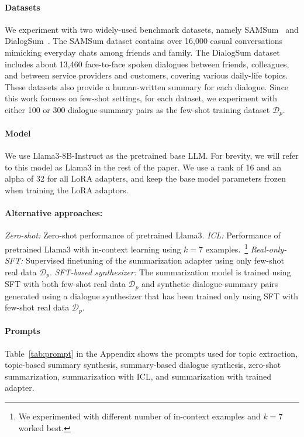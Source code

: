 \paragraph{Datasets} We experiment with two widely-used benchmark datasets, namely SAMSum~\citep{gliwa-etal-2019-samsum} and DialogSum~\citep{chen2021dialogsum}. The SAMSum dataset contains over 16,000 casual conversations mimicking everyday chats among friends and family. The DialogSum dataset includes about 13,460 face-to-face spoken dialogues between friends, colleagues, and between service providers and customers, covering various daily-life topics. These datasets also provide a human-written summary for each dialogue. Since this work focuses on few-shot settings, for each dataset, we experiment with either 100 or 300 dialogue-summary pairs as the few-shot training dataset $\mathcal{D}_p$.

\paragraph{Model} We use Llama3-8B-Instruct \citep{dubey2024llama} as the pretrained base LLM. For brevity, we will refer to this model as Llama3 in the rest of the paper. We use a rank of 16 and an alpha of 32 for all LoRA adapters, and keep the base model parameters frozen when training the LoRA adaptors. 

\paragraph{Alternative approaches:} \textit{Zero-shot:} Zero-shot performance of pretrained Llama3. \textit{ICL:} Performance of pretrained Llama3 with in-context learning using $k=7$ examples.~\footnote{We experimented with different number of in-context examples and $k=7$ worked best.} \textit{Real-only-SFT:} Supervised finetuning of the summarization adapter using only few-shot real data $\mathcal{D}_p$. \textit{SFT-based synthesizer:} The summarization model is trained using SFT with both few-shot real data $\mathcal{D}_p$ and synthetic dialogue-summary pairs generated using a dialogue synthesizer that has been trained only using SFT with few-shot real data $\mathcal{D}_p$.

\paragraph{Prompts} Table~\ref{tab:prompt} in the Appendix shows the prompts used for topic extraction, topic-based summary synthesis, summary-based dialogue synthesis, zero-shot summarization, summarization with ICL, and summarization with trained adapter.

